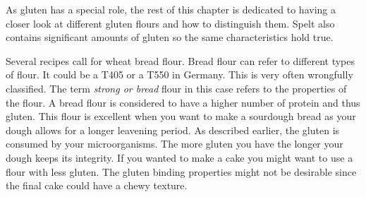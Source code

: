\begin{table}[]
  \centering
  \caption{An overview of different grain types and the steps involved in the respective bread making process}
\end{table}


As gluten has a special role, the rest of this chapter is dedicated to having a
closer look at different gluten flours and how to distinguish them. Spelt
also contains significant amounts of gluten so the same characteristics hold
true.

Several recipes call for wheat bread flour. Bread flour can refer to different types
of flour. It could be a T405 or a T550 in Germany. This is very often
wrongfully classified. The term  \textit{strong or bread} flour in this case
refers to the properties of the flour. A bread flour is considered to have a
higher number of protein and thus gluten. This flour is excellent when you
want to make a sourdough bread as your dough allows for a longer leavening
period. As described earlier, the gluten is consumed by your microorganisms.
The more gluten you have the longer your dough keeps its integrity. If you wanted
to make a cake you might want to use a flour with less gluten. The gluten binding
properties might not be desirable since the final cake could have a chewy texture.

